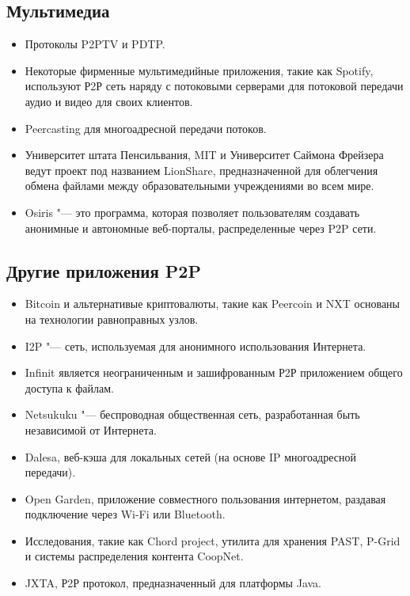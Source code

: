 \documentclass[bachelor, och, coursework]{SCWorks}
\begin{document}
\subsection{Мультимедиа}
\begin{itemize}
    \item Протоколы P2PTV и PDTP.
    \item Некоторые фирменные мультимедийные приложения, такие как Spotify, используют Р2Р сеть наряду с потоковыми серверами для потоковой передачи аудио и видео для своих клиентов.
    \item Peercasting для многоадресной передачи потоков.
    \item Университет штата Пенсильвания, MIT и Университет Саймона Фрейзера ведут проект под названием LionShare, предназначенной для облегчения обмена файлами между образовательными учреждениями во всем мире.
    \item Osiris "--- это программа, которая позволяет пользователям создавать анонимные и автономные веб-порталы, распределенные через P2P сети.
\end{itemize}
\subsection{Другие приложения P2P}
\begin{itemize}
    \item Bitcoin и альтернативые криптовалюты, такие как Peercoin и NXT основаны на технологии равноправных узлов.
    \item I2P "--- сеть, используемая для анонимного использования Интернета.
    \item Infinit является неограниченным и зашифрованным Р2Р приложением общего доступа к файлам.
    \item Netsukuku "--- беспроводная общественная сеть, разработанная быть независимой от Интернета.
    \item Dalesa, веб-кэша для локальных сетей (на основе IP многоадресной передачи).
    \item Open Garden, приложение совместного пользования интернетом, раздавая подключение через Wi-Fi или Bluetooth.
    \item Исследования, такие как Chord project, утилита для хранения PAST, P-Grid и системы распределения контента CoopNet.
    \item JXTA, Р2Р протокол, предназначенный для платформы Java.
\end{itemize}



\conclusion



\end{document}

